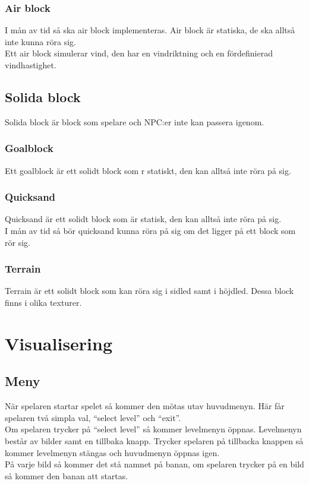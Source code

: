 \documentclass{TDP003mall}
\begin{document}
\subsubsection{Air block}
I mån av tid så ska air block implementeras. Air block är statiska, de ska alltså inte kunna röra sig. \\
Ett air block simulerar vind, den har en vindriktning och en fördefinierad vindhastighet.

\subsection{Solida block}
Solida block är block som spelare och NPC:er inte kan passera igenom.

\subsubsection{Goalblock}
Ett goalblock är ett solidt block som r statiskt, den kan alltså inte röra på sig. \\


\subsubsection{Quicksand}
Quicksand är ett solidt block som är statisk, den kan alltså inte röra på sig. \\
I mån av tid så bör quicksand kunna röra på sig om det ligger på ett block som rör sig.

\subsubsection{Terrain}
Terrain är ett solidt block som kan röra sig i sidled samt i höjdled. Dessa block finns i olika texturer.

\section{Visualisering}
\subsection{Meny}
När spelaren startar spelet så kommer den mötas utav huvudmenyn. Här får spelaren två simpla val, ``select level'' och ``exit''. \\
Om spelaren trycker på ``select level'' så kommer levelmenyn öppnas. Levelmenyn består av bilder samt en tillbaka knapp. Trycker spelaren på tillbacka knappen så kommer levelmenyn stängas och huvudmenyn öppnas igen. \\
På varje bild så kommer det stå namnet på banan, om spelaren trycker på en bild så kommer den banan att startas.
\end{document}
